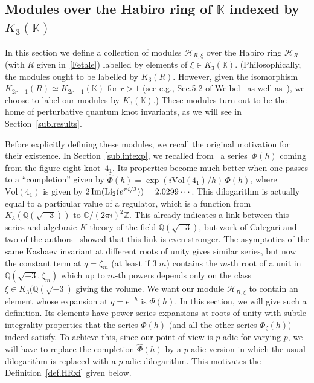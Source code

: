 \documentclass[12pt,reqno]{amsart}
\theoremstyle{definition}
\def\BZ{\mathbb Z}
\def\BQ{\mathbb Q}
\def\BC{\mathbb C}
\def\BK{\mathbb K}
\def\calH{\mathcal H}
\def\Li{\mathrm{Li}}
\def\Im{\mathrm{Im}}
\def\z{\zeta}
\begin{document}
\subsection{\texorpdfstring{Modules over the Habiro ring of $\BK$ indexed
    by $K_3(\BK)$}{Modules over the Habiro ring of K indexed by K\_3(K)}}
\label{sub.habmod}

In this section we define a collection of modules $\calH_{R,\xi}$ over the Habiro ring
$\calH_{R}$ (with $R$ given in~\eqref{Fetale}) labelled by elements of
$\xi\in K_3(\BK)$. (Philosophically, the modules ought to be labelled by $K_3(R)$.
However, given the isomorphism $K_{2r-1}(R) \simeq K_{2r-1}(\BK)$ for $r>1$
(see e.g., Sec.5.2 of Weibel~\cite{Weibel} as well as~\cite[Eqn.(33)]{CGZ}), we
choose to label our modules by $K_3(\BK)$.)
These modules turn out to be the home of perturbative
quantum knot invariants, as we will see in Section~\ref{sub.results}.

Before explicitly defining these modules,
we recall the original motivation for their existence.
In Section~\ref{sub.intexp}, we recalled from~\cite{GZ:kashaev} a series~$\Phi(h)$
coming from the figure eight knot~$4_1$.
Its properties become much better when one passes to a ``completion'' given by
$\widehat{\Phi}(h)=\exp(i\mathrm{Vol}(4_1)/h)\,\Phi(h)$, where
$\mathrm{Vol}(4_1)$ is given by $2\thinspace\Im(\Li_{2}(e^{\pi i/3}))=2.0299\cdots$.
This dilogarithm is actually equal to a particular value of a regulator, which is a
function from $K_3(\BQ(\sqrt{-3}))$ to $\BC/(2\pi i)^2\BZ$.
This already indicates a link between this series and algebraic $K$-theory of the
field $\BQ(\sqrt{-3})$,
but work of Calegari and two of the authors~\cite{CGZ} showed that this link is
even stronger.
The asymptotics of the same Kashaev invariant at different roots of unity gives
similar series, but now the constant term at $q=\z_m$ (at least if $3|m$) contains
the $m$-th root of a unit in $\BQ(\sqrt{-3},\z_m)$ which up to $m$-th powers depends
only on the class $\xi\in K_3(\BQ(\sqrt{-3})$ giving the volume.
We want our module $\calH_{R,\xi}$ to contain an element whose expansion at
$q=e^{-h}$ is $\Phi(h)$.
In this section, we will give such a definition. Its elements have power series
expansions at roots of unity with subtle integrality properties that the series
$\Phi(h)$ (and all the other series $\Phi_\z(h)$) indeed satisfy.
To achieve this, since our point of view is $p$-adic for varying $p$, we will have
to replace the completion $\widehat{\Phi}(h)$ by a $p$-adic version in which
the usual dilogarithm is replaced with a $p$-adic dilogarithm. This motivates the
Definition~\ref{def.HRxi} given below.
\end{document}
